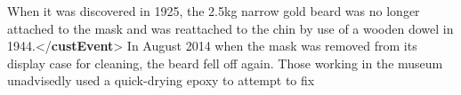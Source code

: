\begin{shaded}
\hspace*{1em}\hspace*{1em}\hspace*{1em}\mbox{}\newline 
\hspace*{1em}\hspace*{1em}\hspace*{1em}\hspace*{1em}When it was discovered in 1925, the 2.5kg narrow gold beard was no longer attached to\mbox{}\newline 
\hspace*{1em}\hspace*{1em}\hspace*{1em}\hspace*{1em}\hspace*{1em}\hspace*{1em}\hspace*{1em}\hspace*{1em}\hspace*{1em}\hspace*{1em} the mask and was reattached to the chin by use of a wooden dowel in 1944.{</\textbf{custEvent}>}\mbox{}\newline 
\hspace*{1em}\hspace*{1em}\hspace*{1em}\hspace*{1em} In August 2014 when the mask was removed from its display case for cleaning, the\mbox{}\newline 
\hspace*{1em}\hspace*{1em}\hspace*{1em}\hspace*{1em}\hspace*{1em}\hspace*{1em}\hspace*{1em}\hspace*{1em}\hspace*{1em}\hspace*{1em} beard fell off again. Those working in the museum unadvisedly used a quick-drying epoxy to attempt to fix\mbox{}\newline 

\end{shaded}
